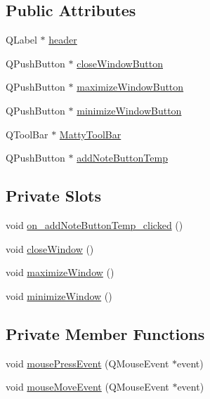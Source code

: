 \subsection*{Public Attributes}
\begin{DoxyCompactItemize}
\item 
Q\+Label $\ast$ \hyperlink{classMattyNotes_a855747a36f73f173f3d8f468c7196572}{header}
\item 
Q\+Push\+Button $\ast$ \hyperlink{classMattyNotes_ac72ba30ddc403561ed6904c4678caaaf}{close\+Window\+Button}
\item 
Q\+Push\+Button $\ast$ \hyperlink{classMattyNotes_a489ab2a613831dd27ba01eccf323235a}{maximize\+Window\+Button}
\item 
Q\+Push\+Button $\ast$ \hyperlink{classMattyNotes_a7d7fc5932df5ad6d5cee0fffe2a2feef}{minimize\+Window\+Button}
\item 
Q\+Tool\+Bar $\ast$ \hyperlink{classMattyNotes_ac780e9814bcce6c80afb9cc22d2b9af6}{Matty\+Tool\+Bar}
\item 
Q\+Push\+Button $\ast$ \hyperlink{classMattyNotes_a319952a9839f335ab9856b83369ea454}{add\+Note\+Button\+Temp}
\end{DoxyCompactItemize}
\subsection*{Private Slots}
\begin{DoxyCompactItemize}
\item 
void \hyperlink{classMattyNotes_a03ee529c5492bc8d73a8a93ecc32c394}{on\+\_\+add\+Note\+Button\+Temp\+\_\+clicked} ()
\item 
void \hyperlink{classMattyNotes_a63c0d10781a0acc57387682282aded37}{close\+Window} ()
\item 
void \hyperlink{classMattyNotes_a49cfcd1087c5f3c0c9f5ced2b7675e6f}{maximize\+Window} ()
\item 
void \hyperlink{classMattyNotes_a59034e42bf605fafd6b37e513b6f85fb}{minimize\+Window} ()
\end{DoxyCompactItemize}
\subsection*{Private Member Functions}
\begin{DoxyCompactItemize}
\item 
void \hyperlink{classMattyNotes_a4818a8cc2dbd824bc005034cb2656198}{mouse\+Press\+Event} (Q\+Mouse\+Event $\ast$event)
\item 
void \hyperlink{classMattyNotes_a0b9d1b50929a097d705e211b57fb12d0}{mouse\+Move\+Event} (Q\+Mouse\+Event $\ast$event)
\end{DoxyCompactItemize}
